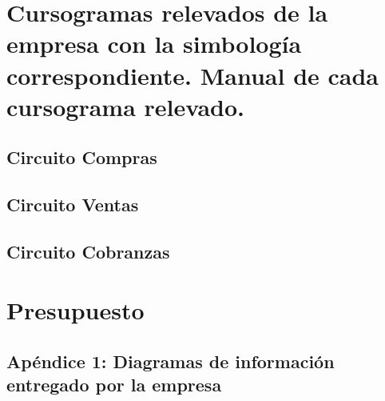 \documentclass[12pt,titlepage]{report}
\begin{document}
\part{Cursogramas relevados de la empresa con la simbología correspondiente. Manual de cada cursograma relevado.}

\chapter{Circuito Compras}

\chapter{Circuito Ventas}

\chapter{Circuito Cobranzas}


\part{Presupuesto}

\appendix
\chapter{Ap\'endice 1: Diagramas de información entregado por la empresa}


\end{document}
